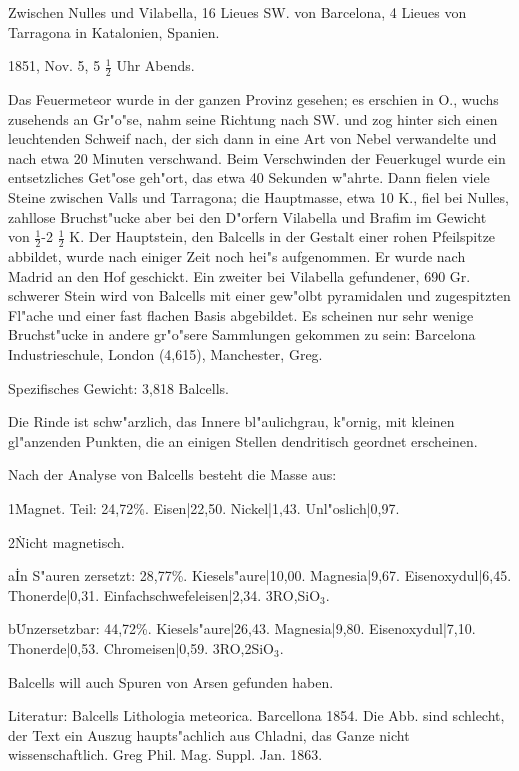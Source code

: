 \documentclass[a4paper, 11pt, oneside]{article}
\begin{document}
Zwischen Nulles und Vilabella, 16 Lieues SW. von Barcelona, 4 Lieues von Tarragona in Katalonien, Spanien.

1851, Nov. 5, 5 $\frac{1}{2}$ Uhr Abends.

Das Feuermeteor wurde in der ganzen Provinz gesehen; es erschien in O., wuchs zusehends an Gr"o"se, nahm seine Richtung nach SW. und zog hinter sich einen leuchtenden Schweif nach, der sich dann in eine Art von Nebel verwandelte und nach etwa 20 Minuten verschwand. Beim Verschwinden der Feuerkugel wurde ein entsetzliches Get"ose geh"ort, das etwa 40 Sekunden w"ahrte. Dann fielen viele Steine zwischen Valls und Tarragona; die Hauptmasse, etwa 10 K., fiel bei Nulles, zahllose Bruchst"ucke aber bei den D"orfern Vilabella und Brafim im Gewicht von $\frac{1}{2}$-2 $\frac{1}{2}$ K. Der Hauptstein, den Balcells in der Gestalt einer rohen Pfeilspitze abbildet, wurde nach einiger Zeit noch hei"s aufgenommen. Er wurde nach Madrid an den Hof geschickt. Ein zweiter bei Vilabella gefundener, 690 Gr. schwerer Stein wird von Balcells mit einer gew"olbt pyramidalen und zugespitzten Fl"ache und einer fast flachen Basis abgebildet. Es scheinen nur sehr wenige Bruchst"ucke in andere gr"o"sere Sammlungen gekommen zu sein: Barcelona Industrieschule, London (4,615), Manchester, Greg.

Spezifisches Gewicht: 3,818 Balcells.

Die Rinde ist schw"arzlich, das Innere bl"aulichgrau, k"ornig, mit kleinen gl"anzenden Punkten, die an einigen Stellen dendritisch geordnet erscheinen.

Nach der Analyse von Balcells besteht die Masse aus:

1\. Magnet. Teil: 24,72\%.  
Eisen|22,50.  
Nickel|1,43.  
Unl"oslich|0,97.

2\. Nicht magnetisch.

a\. In S"auren zersetzt: 28,77\%.  
Kiesels"aure|10,00.  
Magnesia|9,67.  
Eisenoxydul|6,45.  
Thonerde|0,31.  
Einfachschwefeleisen|2,34.  
3RO,SiO$_{3}$.

b\. Unzersetzbar: 44,72\%.  
Kiesels"aure|26,43.  
Magnesia|9,80.  
Eisenoxydul|7,10.  
Thonerde|0,53.  
Chromeisen|0,59.  
3RO,2SiO$_{3}$.

Balcells will auch Spuren von Arsen gefunden haben.

Literatur: Balcells Lithologia meteorica. Barcellona 1854. Die Abb. sind schlecht, der Text ein Auszug haupts"achlich aus Chladni, das Ganze nicht wissenschaftlich. Greg Phil. Mag. Suppl. Jan. 1863.
\end{document}
